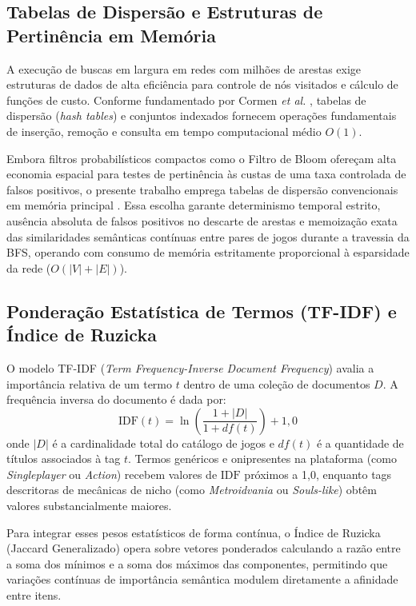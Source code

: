 \documentclass[conference]{IEEEtran}
\begin{document}
\subsection{Tabelas de Dispersão e Estruturas de Pertinência em Memória}
A execução de buscas em largura em redes com milhões de arestas exige estruturas de dados de alta eficiência para controle de nós visitados e cálculo de funções de custo. Conforme fundamentado por Cormen \textit{et al.} \cite{cormen2009}, tabelas de dispersão (\textit{hash tables}) e conjuntos indexados fornecem operações fundamentais de inserção, remoção e consulta em tempo computacional médio $O(1)$. 

Embora filtros probabilísticos compactos como o Filtro de Bloom \cite{bloom1970} ofereçam alta economia espacial para testes de pertinência às custas de uma taxa controlada de falsos positivos, o presente trabalho emprega tabelas de dispersão convencionais em memória principal \cite{cormen2009}. Essa escolha garante determinismo temporal estrito, ausência absoluta de falsos positivos no descarte de arestas e memoização exata das similaridades semânticas contínuas entre pares de jogos durante a travessia da BFS, operando com consumo de memória estritamente proporcional à esparsidade da rede ($O(|V| + |E|)$).

\subsection{Ponderação Estatística de Termos (TF-IDF) e Índice de Ruzicka}
O modelo TF-IDF (\textit{Term Frequency-Inverse Document Frequency}) \cite{salton1988} avalia a importância relativa de um termo $t$ dentro de uma coleção de documentos $D$. A frequência inversa do documento é dada por:
\begin{equation}
\text{IDF}(t) = \ln\left(\frac{1 + |D|}{1 + df(t)}\right) + 1{,}0
\label{eq:idf}
\end{equation}
onde $|D|$ é a cardinalidade total do catálogo de jogos e $df(t)$ é a quantidade de títulos associados à tag $t$. Termos genéricos e onipresentes na plataforma (como \textit{Singleplayer} ou \textit{Action}) recebem valores de $\text{IDF}$ próximos a 1,0, enquanto tags descritoras de mecânicas de nicho (como \textit{Metroidvania} ou \textit{Souls-like}) obtêm valores substancialmente maiores. 

Para integrar esses pesos estatísticos de forma contínua, o Índice de Ruzicka (Jaccard Generalizado) opera sobre vetores ponderados calculando a razão entre a soma dos mínimos e a soma dos máximos das componentes, permitindo que variações contínuas de importância semântica modulem diretamente a afinidade entre itens.
\end{document}
